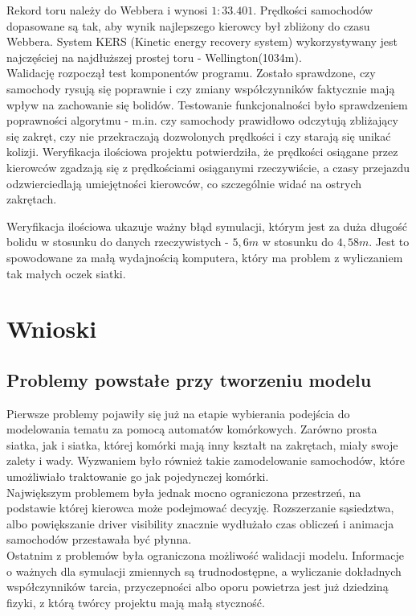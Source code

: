 \documentclass{article}
\begin{document}
Rekord toru należy do Webbera i wynosi $1:33.401$. Prędkości samochodów dopasowane są tak, aby wynik najlepszego kierowcy był zbliżony do czasu Webbera. System KERS (Kinetic energy recovery system) wykorzystywany jest najczęściej na najdłuższej prostej toru - Wellington(1034m). \\

Walidację rozpoczął test komponentów programu. Zostało sprawdzone, czy samochody rysują się poprawnie i czy zmiany współczynników faktycznie mają wpływ na zachowanie się bolidów. Testowanie funkcjonalności było sprawdzeniem poprawności algorytmu - m.in. czy samochody prawidłowo odczytują zbliżający się zakręt, czy nie przekraczają dozwolonych prędkości i czy starają się unikać kolizji. Weryfikacja ilościowa projektu potwierdziła, że prędkości osiągane przez kierowców zgadzają się z prędkościami osiąganymi rzeczywiście, a czasy przejazdu odzwierciedlają umiejętności kierowców, co szczególnie widać na ostrych zakrętach.

Weryfikacja ilościowa ukazuje ważny błąd symulacji, którym jest za duża długość bolidu w stosunku do danych rzeczywistych - $5,6m$ w stosunku do $4,58m$. Jest to spowodowane za małą wydajnością komputera, który ma problem z wyliczaniem tak małych oczek siatki.


\section{Wnioski}
\subsection{Problemy powstałe przy tworzeniu modelu}
Pierwsze problemy pojawiły się już na etapie wybierania podejścia do modelowania tematu za pomocą automatów komórkowych. Zarówno prosta siatka, jak i siatka, której komórki mają inny kształt na zakrętach, miały swoje zalety i wady. Wyzwaniem było również takie zamodelowanie samochodów, które umożliwiało traktowanie go jak pojedynczej komórki. \\

Największym problemem była jednak mocno ograniczona przestrzeń, na podstawie której kierowca może podejmować decyzję. Rozszerzanie sąsiedztwa, albo powiększanie driver visibility znacznie wydłużało czas obliczeń i animacja samochodów przestawała być płynna. \\

Ostatnim z problemów była ograniczona możliwość walidacji modelu. Informacje o ważnych dla symulacji zmiennych są trudnodostępne, a wyliczanie dokładnych współczynników tarcia, przyczepności albo oporu powietrza jest już dziedziną fizyki, z którą twórcy projektu mają małą styczność. 
\end{document}
